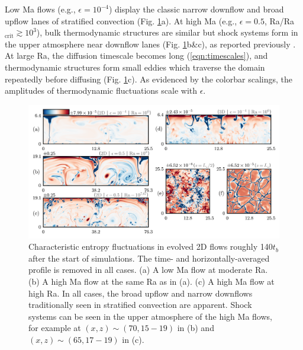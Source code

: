 \documentclass[aps, prfluids, onecolumn, notitlepage, nofootinbib, groupedaddress, amsfonts, amssymb, amsmath]{revtex4-1}
\begin{document}
Low Ma flows (e.g., $\epsilon = 10^{-4}$)
display the classic narrow downflow and broad upflow lanes of stratified
convection (Fig. \ref{fig:entropy_snapshots}a).
At high Ma (e.g., $\epsilon = 0.5$, Ra/Ra$_{\text{crit}} \gtrsim 10^3$), 
bulk thermodynamic structures are similar but
shock systems form in the upper atmosphere near downflow lanes 
(Fig. \ref{fig:entropy_snapshots}b\&c), as reported previously
\cite{cattaneo&all1990, malagoli&all1990}.
At large Ra, the diffusion timescale becomes long (\ref{eqn:timescales}), 
and
thermodynamic structures form small eddies which traverse the
domain repeatedly before diffusing (Fig. \ref{fig:entropy_snapshots}c).
As evidenced by the colorbar scalings, the
amplitudes of thermodynamic fluctuations scale with $\epsilon$.
\begin{figure}[t!]
\includegraphics[width=\textwidth]{./figs/snapshots_fig.png}
\caption{Characteristic entropy fluctuations in evolved 2D flows roughly
140$t_b$ after the start of simulations. 
The time- and horizontally-averaged profile is removed in all cases.  
(a) A low Ma flow at moderate Ra. (b) A high Ma flow at the same Ra as in (a).
(c) A high Ma flow at high Ra.  In all cases, the broad upflow and narrow downflows
traditionally seen in stratified convection are apparent.
Shock systems can be seen in the upper atmosphere of the high Ma flows,
for example at $(x, z) \sim (70, 15-19)$ in (b) and $(x, z) \sim 
(65, 17-19)$ in (c).
\label{fig:entropy_snapshots} }
\end{figure}
\end{document}
